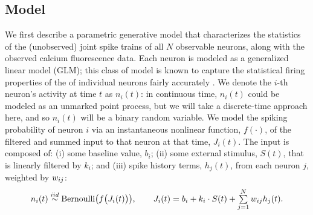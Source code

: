 \long{}


\subsection{Model} 
\label{sec:methods:markov-setup}
We first describe a parametric generative model that characterizes the
statistics of the (unobserved) joint spike trains of all $N$
observable neurons, along with the observed calcium fluorescence data.
Each neuron is modeled as a generalized linear model (GLM); this class
of model is known to capture the statistical firing properties of the
of individual neurons fairly accurately
\cite{BRIL88,CSK88,BRIL92,PG00,PILL07,PAN03d,PAN04c,Rigat06,TRUC05,NYK06,KP06,Vidne08,Stevenson2009}.
We denote the $i$-th neuron's activity at time $t$ as $n_i(t)$: in
continuous time, $n_i(t)$ could be modeled as an unmarked point
process, but we will take a discrete-time approach here, and so
$n_i(t)$ will be a binary random variable.  We model the spiking
probability of neuron $i$ via an instantaneous nonlinear function,
$f(\cdot)$, of the filtered and summed input to that neuron at that
time, $J_i(t)$.  The input is composed of: (i) some baseline value,
$b_i$; (ii) some external stimulus, $S(t)$, that is linearly filtered
by $k_i$; and (iii) spike history terms, $h_j(t)$, from each neuron
$j$, weighted by $w_{ij}$:
\begin{equation} \label{eqn:glm:definition}
\begin{array}{l}
n_i(t)\overset{iid}{\sim} \text{Bernoulli}\big(f\big(J_i(t) \big)
\big), \qquad J_i(t)=b_i+k_i\cdot S(t)+\sum \limits_{j=1}^{N} \w_{ij}
h_{j}(t).
\end{array}
\end{equation}

